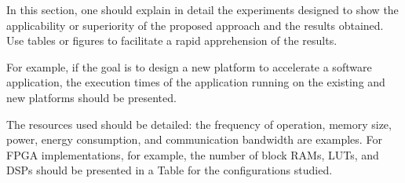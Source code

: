 In this section, one should explain in detail the experiments designed to show
the applicability or superiority of the proposed approach and the results
obtained. Use tables or figures to facilitate a rapid apprehension of the
results.

For example, if the goal is to design a new platform to accelerate a software
application, the execution times of the application running on the existing and
new platforms should be presented.

The resources used should be detailed: the frequency of operation, memory size,
power, energy consumption, and communication bandwidth are examples. For FPGA
implementations, for example, the number of block RAMs, LUTs, and DSPs should be
presented in a Table for the configurations studied.
